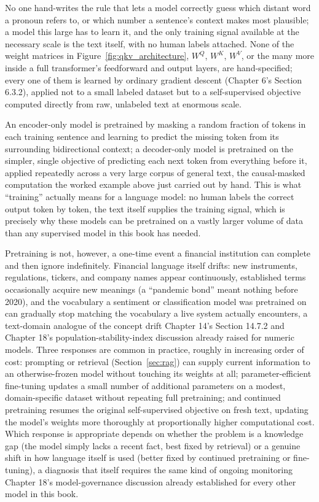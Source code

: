 \documentclass[../ai_in_finance]{subfiles}
\begin{document}
No one hand-writes the rule that lets a model correctly guess which distant word a pronoun refers to, or which number a sentence's context makes most plausible; a model this large has to learn it, and the only training signal available at the necessary scale is the text itself, with no human labels attached. None of the weight matrices in Figure~\ref{fig:qkv_architecture}, $W^Q$, $W^K$, $W^V$, or the many more inside a full transformer's feedforward and output layers, are hand-specified; every one of them is learned by ordinary gradient descent (Chapter 6's Section 6.3.2), applied not to a small labeled dataset but to a self-supervised objective computed directly from raw, unlabeled text at enormous scale.

An encoder-only model is pretrained by masking a random fraction of tokens in each training sentence and learning to predict the missing token from its surrounding bidirectional context; a decoder-only model is pretrained on the simpler, single objective of predicting each next token from everything before it, applied repeatedly across a very large corpus of general text, the causal-masked computation the worked example above just carried out by hand. This is what ``training'' actually means for a language model: no human labels the correct output token by token, the text itself supplies the training signal, which is precisely why these models can be pretrained on a vastly larger volume of data than any supervised model in this book has needed.

Pretraining is not, however, a one-time event a financial institution can complete and then ignore indefinitely. Financial language itself drifts: new instruments, regulations, tickers, and company names appear continuously, established terms occasionally acquire new meanings (a ``pandemic bond'' meant nothing before 2020), and the vocabulary a sentiment or classification model was pretrained on can gradually stop matching the vocabulary a live system actually encounters, a text-domain analogue of the concept drift Chapter 14's Section 14.7.2 and Chapter 18's population-stability-index discussion already raised for numeric models. Three responses are common in practice, roughly in increasing order of cost: prompting or retrieval (Section~\ref{sec:rag}) can supply current information to an otherwise-frozen model without touching its weights at all; parameter-efficient fine-tuning updates a small number of additional parameters on a modest, domain-specific dataset without repeating full pretraining; and continued pretraining resumes the original self-supervised objective on fresh text, updating the model's weights more thoroughly at proportionally higher computational cost. Which response is appropriate depends on whether the problem is a knowledge gap (the model simply lacks a recent fact, best fixed by retrieval) or a genuine shift in how language itself is used (better fixed by continued pretraining or fine-tuning), a diagnosis that itself requires the same kind of ongoing monitoring Chapter 18's model-governance discussion already established for every other model in this book.
\end{document}
